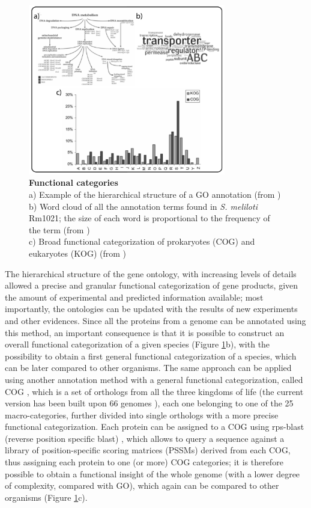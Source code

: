 \begin{figure}[!tb]
	\center
    \includegraphics[width=0.77\textwidth]{figures/Introduction/thesis_4}
	\caption{\label{fig:gocog}\textbf{Functional categories}\\
			a) Example of the hierarchical structure of a GO annotation (from \cite{ashburner2000gene}) \\
			b) Word cloud of all the annotation terms found in \textit{S. meliloti} Rm1021; the size of each word is proportional to the frequency of the term (from \cite{wordcloud}) \\
			c) Broad functional categorization of prokaryotes (COG) and eukaryotes (KOG) (from \cite{tatusov2003cog})}
\end{figure}

The hierarchical structure of the gene ontology, with increasing levels of details allowed a precise and granular functional categorization of gene products, given the amount of experimental and predicted information available; most importantly, the ontologies can be updated with the results of new experiments and other evidences. Since all the proteins from a genome can be annotated using this method, an important consequence is that it is possible to construct an overall functional categorization of a given species (Figure \ref{fig:gocog}b), with the possibility to obtain a first general functional categorization of a species, which can be later compared to other organisms. The same approach can be applied using another annotation method with a general functional categorization, called COG \cite{tatusov1997genomic}\cite{tatusov2003cog}, which is a set of orthologs from all the three kingdoms of life (the current version has been built upon 66 genomes \cite{cogcategs}), each one belonging to one of the 25 macro-categories, further divided into single orthologs with a more precise functional categorization. Each protein can be assigned to a COG using rps-blast (reverse position specific blast) \cite{a1999impala}\cite{marchler2002cdd}, which allows to query a sequence against a library of position-specific scoring matrices (PSSMs) derived from each COG, thus assigning each protein to one (or more) COG categories; it is therefore possible to obtain a functional insight of the whole genome (with a lower degree of complexity, compared with GO), which again can be compared to other organisms (Figure \ref{fig:gocog}c).

